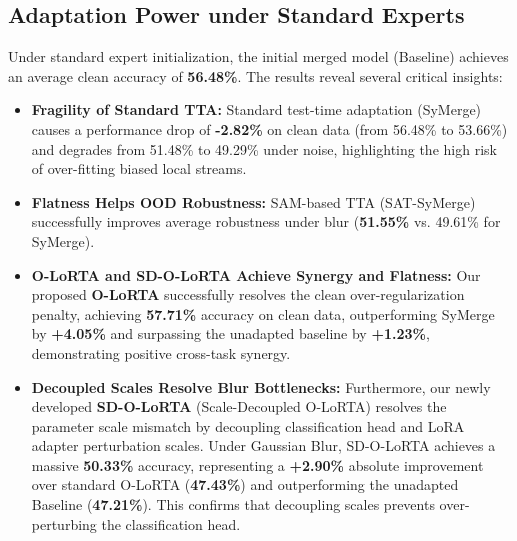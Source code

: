 \documentclass{article}
\theoremstyle{plain}
\theoremstyle{definition}
\theoremstyle{remark}
\begin{document}
\subsection{Adaptation Power under Standard Experts}
Under standard expert initialization, the initial merged model (Baseline) achieves an average clean accuracy of \textbf{56.48\%}. The results reveal several critical insights:
\begin{itemize}
    \item \textbf{Fragility of Standard TTA:} Standard test-time adaptation (SyMerge) causes a performance drop of \textbf{-2.82\%} on clean data (from 56.48\% to 53.66\%) and degrades from 51.48\% to 49.29\% under noise, highlighting the high risk of over-fitting biased local streams.
    \item \textbf{Flatness Helps OOD Robustness:} SAM-based TTA (SAT-SyMerge) successfully improves average robustness under blur (\textbf{51.55\%} vs. 49.61\% for SyMerge).
    \item \textbf{O-LoRTA and SD-O-LoRTA Achieve Synergy and Flatness:} Our proposed \textbf{O-LoRTA} successfully resolves the clean over-regularization penalty, achieving \textbf{57.71\%} accuracy on clean data, outperforming SyMerge by \textbf{+4.05\%} and surpassing the unadapted baseline by \textbf{+1.23\%}, demonstrating positive cross-task synergy. 
    \item \textbf{Decoupled Scales Resolve Blur Bottlenecks:} Furthermore, our newly developed \textbf{SD-O-LoRTA} (Scale-Decoupled O-LoRTA) resolves the parameter scale mismatch by decoupling classification head and LoRA adapter perturbation scales. Under Gaussian Blur, SD-O-LoRTA achieves a massive \textbf{50.33\%} accuracy, representing a \textbf{+2.90\%} absolute improvement over standard O-LoRTA (\textbf{47.43\%}) and outperforming the unadapted Baseline (\textbf{47.21\%}). This confirms that decoupling scales prevents over-perturbing the classification head.
\end{itemize}
\end{document}
